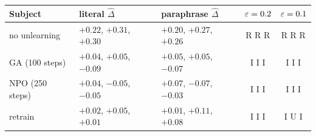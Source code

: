 \begin{tabular}{lllcc}
\toprule
Subject & literal $\hat\Delta$ & paraphrase $\hat\Delta$ & $\varepsilon=0.2$ & $\varepsilon=0.1$ \\
\midrule
no unlearning & $+0.22$, $+0.31$, $+0.30$ & $+0.20$, $+0.27$, $+0.26$ & R R R & R R R \\
GA (100 steps) & $+0.04$, $+0.05$, $-0.09$ & $+0.05$, $+0.05$, $-0.07$ & I I I & I I I \\
NPO (250 steps) & $+0.04$, $-0.05$, $-0.05$ & $+0.07$, $-0.07$, $-0.03$ & I I I & I I I \\
retrain & $+0.02$, $+0.05$, $+0.01$ & $+0.01$, $+0.11$, $+0.08$ & I I I & I U I \\
\bottomrule
\end{tabular}

